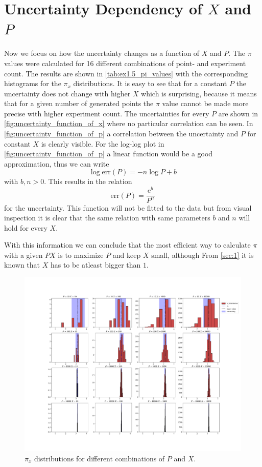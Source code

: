 \section{Uncertainty Dependency of $X$ and $P$}\label{sec:3}
Now we focus on how the uncertainty changes as a function of $X$ and $P$.
The $\pi$ values were calculated for 16 different combinations of point- and
experiment count. The results are shown in \cref{tab:ex1.5_pi_values} with
the corresponding histograms for the $\pi_x$ distributions.
It is easy to see that for a constant $P$ the uncertainty does not
change with higher $X$ which is surprising, because it means that for a
given number of generated points the $\pi$ value cannot be made
more precise with higher experiment count. The uncertainties for every
$P$ are shown in \cref{fig:uncertainty_function_of_x} where no particular 
correlation can be seen. In \cref{fig:uncertainty_function_of_p}
a correlation between the uncertainty and $P$ for constant $X$
is clearly visible. For the log-log plot in \cref{fig:uncertainty_function_of_p} a linear
function would be a good approximation, thus we can write
$$ \log \text{err}(P) = -n\log P + b$$
with $b, n > 0$. This results in the relation
$$\text{err}(P) = \frac{\mathrm{e}^b}{P^n}$$
for the uncertainty. This function will not be fitted to the data but from visual
inspection it is clear that the same relation with same parameters $b$ and $n$
will hold for every $X$. \par
With this information we can conclude that the most efficient way to calculate
$\pi$ with a given $PX$ is to maximize $P$ and keep $X$ small, although From
\cref{sec:1} it is known that $X$ has to be atleast bigger than $1$.
%

%
\begin{figure}[htbp]
	\centering
	\includegraphics[width=1\linewidth]{figs/ex1.5_px_combinations.pdf}
	\caption{$\pi_x$ distributions for different combinations of $P$ and $X$.}
	\label{fig:px_combinations}
\end{figure}
